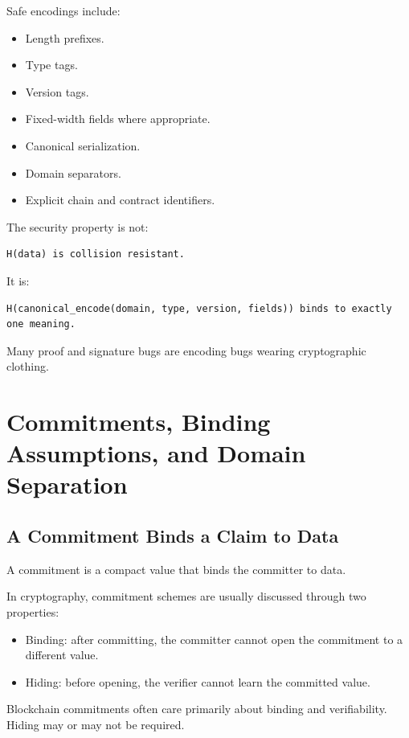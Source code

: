 Safe encodings include:

\begin{itemize}
\tightlist
\item
  Length prefixes.
\item
  Type tags.
\item
  Version tags.
\item
  Fixed-width fields where appropriate.
\item
  Canonical serialization.
\item
  Domain separators.
\item
  Explicit chain and contract identifiers.
\end{itemize}

The security property is not:

\begin{lstlisting}
H(data) is collision resistant.
\end{lstlisting}

It is:

\begin{lstlisting}
H(canonical_encode(domain, type, version, fields)) binds to exactly one meaning.
\end{lstlisting}

Many proof and signature bugs are encoding bugs wearing cryptographic
clothing.

\section{Commitments, Binding Assumptions, and Domain Separation}

\subsection{A Commitment Binds a Claim to Data}

A commitment is a compact value that binds the committer to data.

In cryptography, commitment schemes are usually discussed through two
properties:

\begin{itemize}
\tightlist
\item
  Binding: after committing, the committer cannot open the commitment to
  a different value.
\item
  Hiding: before opening, the verifier cannot learn the committed value.
\end{itemize}

Blockchain commitments often care primarily about binding and
verifiability. Hiding may or may not be required.

